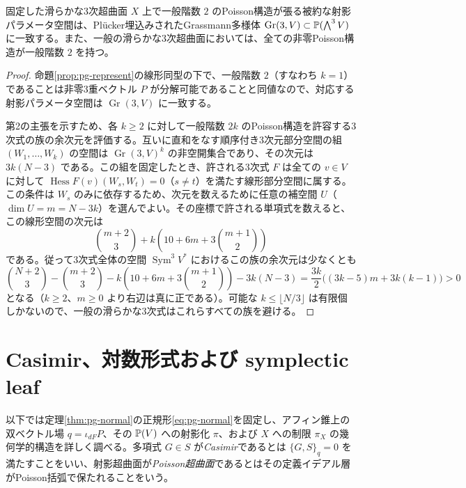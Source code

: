 \begin{corollary}\label{cor:pg-generic}
固定した滑らかな3次超曲面 $X$ 上で一般階数 $2$ のPoisson構造が張る被約な射影パラメータ空間は、Pl\"ucker埋込みされたGrassmann多様体 $\operatorname{Gr}(3,V)\subset\mathbb P(\bigwedge^3V)$ に一致する。また、一般の滑らかな3次超曲面においては、全ての非零Poisson構造が一般階数 $2$ を持つ。
\end{corollary}
\begin{proof}
命題\ref{prop:pg-represent}の線形同型の下で、一般階数 $2$（すなわち $k=1$）であることは非零3重ベクトル $P$ が分解可能であることと同値なので、対応する射影パラメータ空間は $\operatorname{Gr}(3,V)$ に一致する。

第2の主張を示すため、各 $k\ge2$ に対して一般階数 $2k$ のPoisson構造を許容する3次式の族の余次元を評価する。互いに直和をなす順序付き3次元部分空間の組 $(W_1,\ldots,W_k)$ の空間は $\operatorname{Gr}(3,V)^k$ の非空開集合であり、その次元は $3k(N-3)$ である。この組を固定したとき、許される3次式 $F$ は全ての $v\in V$ に対して $\operatorname{Hess}F(v)(W_s,W_t)=0$（$s\ne t$）を満たす線形部分空間に属する。この条件は $W_s$ のみに依存するため、次元を数えるために任意の補空間 $U$（$\dim U=m=N-3k$）を選んでよい。その座標で許される単項式を数えると、この線形空間の次元は
\begin{equation}
\binom{m+2}{3}+k\left(10+6m+3\binom{m+1}{2}\right)
\end{equation}
である。従って3次式全体の空間 $\operatorname{Sym}^3V^*$ におけるこの族の余次元は少なくとも
\begin{equation}
\binom{N+2}{3}-\binom{m+2}{3}
-k\left(10+6m+3\binom{m+1}{2}\right)-3k(N-3)
=\frac{3k}{2}\bigl((3k-5)m+3k(k-1)\bigr)>0\label{eq:pg-codim}
\end{equation}
となる（$k\ge2$、$m\ge0$ より右辺は真に正である）。可能な $k\le\lfloor N/3\rfloor$ は有限個しかないので、一般の滑らかな3次式はこれらすべての族を避ける。
\end{proof}


\section{Casimir、対数形式および symplectic leaf}\label{sec:pg-leaves}

以下では定理\ref{thm:pg-normal}の正規形\eqref{eq:pg-normal}を固定し、アフィン錐上の双ベクトル場 $q=\iota_{dF}P$、その $\mathbb P(V)$ への射影化 $\pi$、および $X$ への制限 $\pi_X$ の幾何学的構造を詳しく調べる。多項式 $G\in S$ が\emph{Casimir}であるとは $\{G,S\}_q=0$ を満たすことをいい、射影超曲面が\emph{Poisson超曲面}であるとはその定義イデアル層がPoisson括弧で保たれることをいう。

